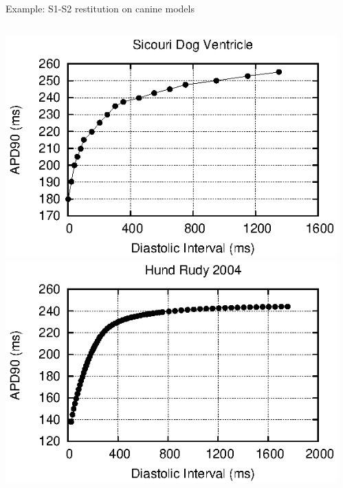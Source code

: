 \documentclass[t,xcolor={usenames,dvipsnames}]{beamer}
\begin{document}
\begin{frame}{Example: S1-S2 restitution on canine models}
\begin{columns}[T]
\begin{column}{.33\linewidth}
\begin{center}
\includegraphics[width=\textwidth]{sicouri_dog_ventricle_s1s2_curve}\\
\vspace{.1cm}
\includegraphics[width=\textwidth]{hund_rudy_2004_s1s2_curve}
\end{center}
\end{column}
\begin{column}{.33\linewidth}
\begin{center}

\end{center}
\end{column}
\end{columns}
\end{frame}
\end{document}
